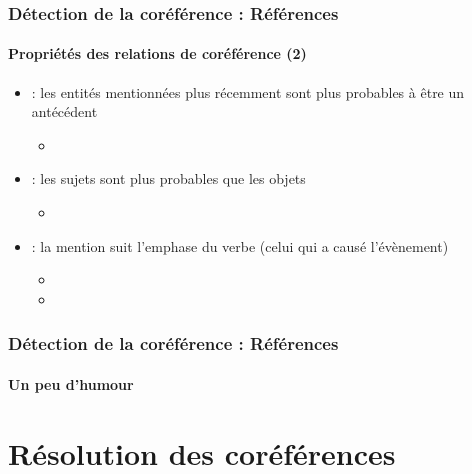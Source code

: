 \documentclass[xcolor=table]{beamer}
\begin{document}
\begin{frame}
	\frametitle{Détection de la coréférence : Références}
	\framesubtitle{Propriétés des relations de coréférence (2)}
	
	\begin{itemize}
		
		\item {} : les entités mentionnées plus récemment sont plus probables à être un antécédent
		\begin{itemize}
			\item {}
		\end{itemize}
		
		\item {} : les sujets sont plus probables que les objets
		\begin{itemize}
			\item {}
		\end{itemize}
		
		\item {} : la mention suit l'emphase du verbe (celui qui a causé l'évènement)
		\begin{itemize}
			\item {}
			\item {}
		\end{itemize}
	\end{itemize}
	
\end{frame}

\begin{frame}
	\frametitle{Détection de la coréférence : Références}
	\framesubtitle{Un peu d'humour}
	
	\begin{center}
	\end{center}
	
\end{frame}

\section{Résolution des coréférences}
\end{document}
